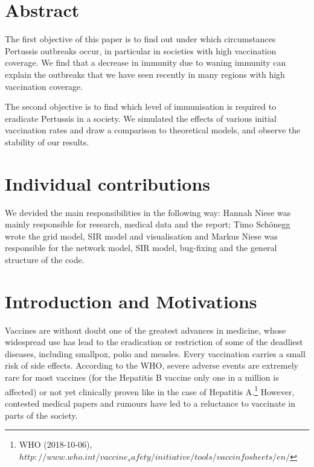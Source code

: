 \documentclass[11pt]{article}
\begin{document}

\tableofcontents

\newpage




\section{Abstract}
The first objective of this paper is to find out under which circumstances Pertussis outbreaks occur, in particular in societies with high vaccination coverage. We find that a decrease in immunity due to waning immunity can explain the outbreaks that we have seen recently in many regions with high vaccination coverage. 

The second objective is to find which level of immunisation is required to eradicate Pertussis in a society. We simulated the effects of various initial vaccination rates and draw a comparison to theoretical models, and observe the stability of our results. 
 
\section{Individual contributions}
We devided the main responsibilities in the following way: Hannah Niese was mainly responsible for research, medical data and the report; Timo Schönegg wrote the grid model, SIR model and visualisation and Markus Niese was responsible for the network model, SIR model, bug-fixing and the general structure of the code. 

\section{Introduction and Motivations}

Vaccines are without doubt one of the greatest advances in medicine, whose widespread use has lead to the eradication or restriction of some of the deadliest diseases, including smallpox, polio and measles. Every vaccination carries a small risk of side effects. According to the WHO, severe adverse events are extremely rare for most vaccines (for the Hepatitis B vaccine only one in a million is affected) or not yet clinically proven like in the case of Hepatitis A.\footnote{WHO (2018-10-06), $http://www.who.int/vaccine_safety/initiative/tools/vaccinfosheets/en/$}  However, contested medical papers and rumours have led to a reluctance to vaccinate in parts of the society.
\end{document}
